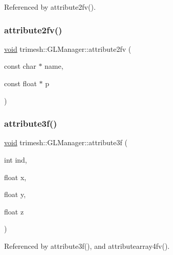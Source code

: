 Referenced by attribute2fv().

\mbox{\label{classtrimesh_1_1GLManager_a4305395d1301d0ae01d3b544d3be63c7}} 
\subsubsection{\texorpdfstring{attribute2fv()}{attribute2fv()}\hspace{0.1cm}{\footnotesize\ttfamily [2/2]}}
{\footnotesize\ttfamily \hyperlink{namespacetrimesh_a784ddfd979e1c579bda795a8edfc3f43}{void} trimesh\+::\+G\+L\+Manager\+::attribute2fv (\begin{DoxyParamCaption}\item[{const char $\ast$}]{name,  }\item[{const float $\ast$}]{p }\end{DoxyParamCaption})\hspace{0.3cm}{\ttfamily [inline]}}

\mbox{\label{classtrimesh_1_1GLManager_a294b73697cb14b57a814f6f57a6e7813}} 
\subsubsection{\texorpdfstring{attribute3f()}{attribute3f()}\hspace{0.1cm}{\footnotesize\ttfamily [1/2]}}
{\footnotesize\ttfamily \hyperlink{namespacetrimesh_a784ddfd979e1c579bda795a8edfc3f43}{void} trimesh\+::\+G\+L\+Manager\+::attribute3f (\begin{DoxyParamCaption}\item[{int}]{ind,  }\item[{float}]{x,  }\item[{float}]{y,  }\item[{float}]{z }\end{DoxyParamCaption})}



Referenced by attribute3f(), and attributearray4fv().

\mbox{\label{classtrimesh_1_1GLManager_a8488dbab17b75b5afb99a956aaa11ef9}} 
